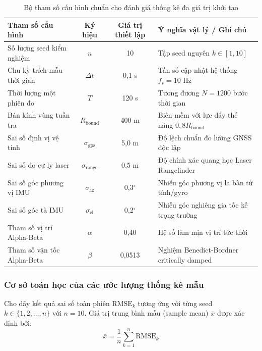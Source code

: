\begin{table}[H]
\centering
\caption{Bộ tham số cấu hình chuẩn cho đánh giá thống kê đa giá trị khởi tạo}
\label{tab:sim-statistical-config}
\begin{tabularx}{\linewidth}{lccX}
\toprule
\textbf{Tham số cấu hình} & \textbf{Ký hiệu} & \textbf{Giá trị thiết lập} & \textbf{Ý nghĩa vật lý / Ghi chú} \\
\midrule
Số lượng seed kiểm nghiệm & $n$ & 10 & Tập seed nguyên $k \in [1, 10]$ \\
Chu kỳ trích mẫu thời gian & $\Delta t$ & 0{,}1 s & Tần số cập nhật hệ thống $f_s = 10$ Hz \\
Thời lượng một phiên đo & $T$ & 120 s & Tương đương $N = 1200$ bước thời gian \\
Bán kính vùng tuần tra & $R_{\text{bound}}$ & 400 m & Biên mềm với lực đẩy thế năng $0{,}8 R_{\text{bound}}$ \\
Sai số định vị vệ tinh & $\sigma_{\text{gps}}$ & 5{,}0 m & Độ lệch chuẩn đo lường GNSS độc lập \\
Sai số đo cự ly laser & $\sigma_{\text{range}}$ & 0{,}5 m & Độ chính xác quang học Laser Rangefinder \\
Sai số góc phương vị IMU & $\sigma_{\text{az}}$ & 0{,}3$^\circ$ & Nhiễu góc phương vị la bàn từ tính/gyro \\
Sai số góc tà IMU & $\sigma_{\text{el}}$ & 0{,}2$^\circ$ & Nhiễu góc nghiêng gia tốc kế trọng trường \\
Tham số vị trí Alpha-Beta & $\alpha$ & 0{,}40 & Hệ số làm mịn vị trí tức thời \\
Tham số vận tốc Alpha-Beta & $\beta$ & 0{,}0513 & Nghiệm Benedict-Bordner critically damped \\
\bottomrule
\end{tabularx}
\end{table}

\subsubsection{Cơ sở toán học của các ước lượng thống kê mẫu}

\hspace{0.5cm} Cho dãy kết quả sai số toàn phiên $\text{RMSE}_k$ tương ứng với từng seed $k \in \{1, 2, \dots, n\}$ với $n = 10$. Giá trị trung bình mẫu (sample mean) $\bar{x}$ được xác định bởi:
\begin{equation}
\bar{x} = \frac{1}{n} \sum_{k=1}^{n} \text{RMSE}_k
\label{eq:sample-mean}
\end{equation}

